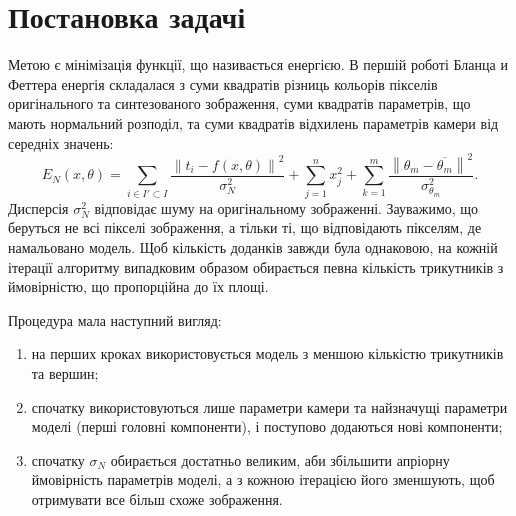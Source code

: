 \section{Постановка задачі}

Метою є мінімізація функції, що називається енергією.
В першій роботі Бланца и Феттера енергія складалася з
суми квадратів різниць кольорів пікселів
оригінального та синтезованого зображення,
суми квадратів параметрів, що мають нормальний розподіл,
та суми квадратів відхилень параметрів камери від середніх значень:
\begin{equation}\label{eq:energy:blanz}
  E_N\left( x, \theta \right)
  = \sum_{i \in I' \subset I}
      \frac{\left\| t_i - f\left( x, \theta \right) \right\|^2}{\sigma^2_N}
  + \sum_{j = 1}^{n} x_j^2
  + \sum_{k = 1}^{m}
      \frac{\left\| \theta_m - \overline{\theta_m} \right\|^2}
           {\sigma^2_{\theta_m}}.
\end{equation}
Дисперсія $\sigma_N^2$ відповідає шуму на оригінальному зображенні.
Зауважимо, що беруться не всі пікселі зображення,
а тільки ті, що відповідають пікселям, де намальовано модель.
Щоб кількість доданків завжди була однаковою,
на кожній ітерації алгоритму випадковим образом
обирається певна кількість трикутників
з ймовірністю, що пропорційна до їх площі.

Процедура мала наступний вигляд:
\begin{enumerate}
  \item на перших кроках використовується модель
    з меншою кількістю трикутників та вершин;
  \item спочатку використовуються лише параметри камери
    та найзначущі параметри моделі (перші головні компоненти),
    і поступово додаються нові компоненти;
  \item спочатку $\sigma_N$ обирається достатньо великим,
    аби збільшити апріорну ймовірність параметрів моделі,
    а з кожною ітерацією його зменшують,
    щоб отримувати все більш схоже зображення.
\end{enumerate}


